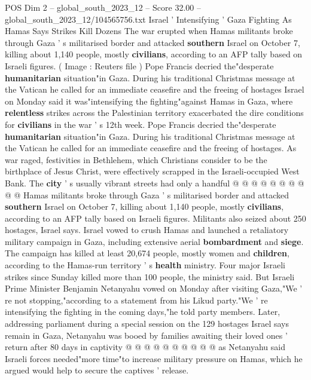 \begin{textsample}{POS Dim 2 – global\_south\_2023\_12 – Score 32.00 – global\_south\_2023\_12/104565756.txt}  \label{ex:f2_pos_023}
Israel ' Intensifying ' Gaza Fighting As Hamas Says Strikes Kill Dozens The war erupted when Hamas militants broke through Gaza ' s militarised border and attacked \textbf{southern} Israel on October 7, killing about 1,140 people, mostly \textbf{civilians}, according to an AFP tally based on Israeli figures. ( Image : Reuters file ) Pope Francis decried the"desperate \textbf{humanitarian} situation"in Gaza.
During his traditional Christmas message at the Vatican he called for an immediate ceasefire and the freeing of hostages Israel on Monday said it was"intensifying the fighting"against Hamas in Gaza, where \textbf{relentless} strikes across the Palestinian territory exacerbated the dire conditions for \textbf{civilians} in the war ' s 12th week.
Pope Francis decried the"desperate \textbf{humanitarian} situation"in Gaza.
During his traditional Christmas message at the Vatican he called for an immediate ceasefire and the freeing of hostages.
As war raged, festivities in Bethlehem, which Christians consider to be the birthplace of Jesus Christ, were effectively scrapped in the Israeli-occupied West Bank.
The \textbf{city} ' s usually vibrant streets had only a handful @ @ @ @ @ @ @ @ @ @ Hamas militants broke through Gaza ' s militarised border and attacked \textbf{southern} Israel on October 7, killing about 1,140 people, mostly \textbf{civilians}, according to an AFP tally based on Israeli figures.
Militants also seized about 250 hostages, Israel says.
Israel vowed to crush Hamas and launched a retaliatory military campaign in Gaza, including extensive aerial \textbf{bombardment} and \textbf{siege}.
The campaign has killed at least 20,674 people, mostly women and \textbf{children}, according to the Hamas-run territory ' s \textbf{health} ministry.
Four major Israeli strikes since Sunday killed more than 100 people, the ministry said.
But Israeli Prime Minister Benjamin Netanyahu vowed on Monday after visiting Gaza,"We ' re not stopping,"according to a statement from his Likud party."We ' re intensifying the fighting in the coming days,"he told party members.
Later, addressing parliament during a special session on the 129 hostages Israel says remain in Gaza, Netanyahu was booed by families awaiting their loved ones ' return after 80 days in captivity @ @ @ @ @ @ @ @ @ @ as Netanyahu said Israeli forces needed"more time"to increase military pressure on Hamas, which he argued would help to secure the captives ' release.

\end{textsample}
